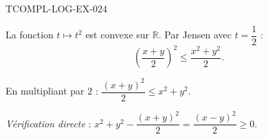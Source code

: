 \begin{corrige}{TCOMPL-LOG-EX-024}

La fonction $t \mapsto t^2$ est convexe sur $\mathbb{R}$. Par Jensen avec $t = \dfrac{1}{2}$ :
\[ \left(\frac{x+y}{2}\right)^2 \leq \frac{x^2 + y^2}{2}. \]


En multipliant par $2$ : $\dfrac{(x+y)^2}{2} \leq x^2 + y^2$.

\emph{Vérification directe} : $x^2 + y^2 - \dfrac{(x+y)^2}{2} = \dfrac{(x-y)^2}{2} \geq 0$.

\end{corrige}
